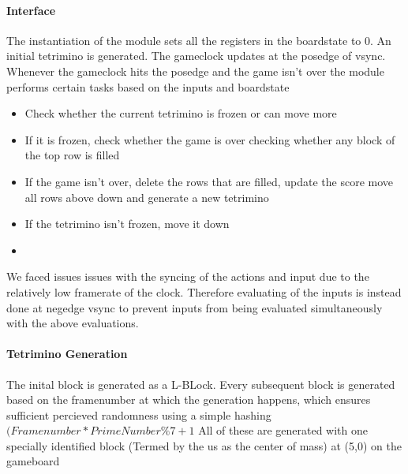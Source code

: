 \paragraph{Interface}
\label{paragraph:interface}
The instantiation of the module sets all the registers in the boardstate to 0. An initial tetrimino is generated.
\newline 
The gameclock updates at the posedge of vsync. Whenever the gameclock hits the posedge and the game isn't over 
the module performs certain tasks based on the inputs and boardstate
\begin{itemize}
    \item Check whether the current tetrimino is frozen or can move more
    \item If it is frozen, check whether the game is over checking whether any block of the top row is filled
    \item If the game isn't over, delete the rows that are filled, update the score move all rows above down and generate a new tetrimino
    \item If the tetrimino isn't frozen, move it down 
    \item 
\end{itemize}
We faced issues issues with the syncing of the actions and input due to the relatively low framerate of the clock. 
Therefore evaluating of the inputs is instead done at negedge vsync to prevent inputs 
from being evaluated simultaneously with the above evaluations.

\paragraph{Tetrimino Generation }
\label{paragraph:tetgen}
The inital block is generated as a L-BLock. 
Every subsequent block is generated based on the framenumber 
at which the generation happens, which ensures sufficient percieved 
randomness using a simple hashing
 \( (Framenumber*PrimeNumber \% 7 +1 \) 
 All of these are generated with one specially identified block
 (Termed by the us as the center of mass) at (5,0) on the gameboard

